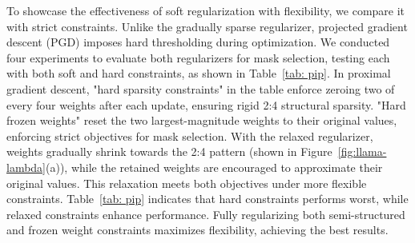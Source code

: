 To showcase the effectiveness of soft regularization with flexibility, we compare it with strict constraints. Unlike the gradually sparse regularizer, projected gradient descent (PGD) imposes hard thresholding during optimization. We conducted four experiments to evaluate both regularizers for mask selection, testing each with both soft and hard constraints, as shown in Table~\ref{tab: pip}.
In proximal gradient descent, "hard sparsity constraints" in the table enforce zeroing two of every four weights after each update, ensuring rigid 2:4 structural sparsity. "Hard frozen weights" reset the two largest-magnitude weights to their original values, enforcing strict objectives for mask selection.
With the relaxed regularizer, weights gradually shrink towards the 2:4 pattern (shown in Figure~\ref{fig:llama-lambda}(a)), while the retained weights are encouraged to approximate their original values. This relaxation meets both objectives under more flexible constraints. Table~\ref{tab: pip} indicates that hard constraints performs worst, while relaxed constraints enhance performance. Fully regularizing both semi-structured and frozen weight constraints maximizes flexibility, achieving the best results.
